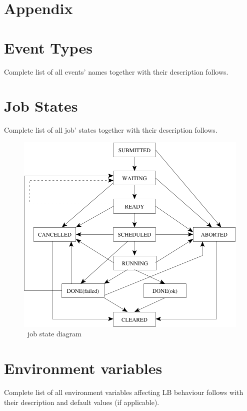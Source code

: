 \section*{Appendix}

\section{\LB Event Types}
\label{a:events}
Complete list of all events' names together with their description follows.


\newpage
\section{\LB Job States}
\label{a:jobstat}
Complete list of all job' states together with their description follows.


\begin{figure}[hb]
\centering
\includegraphics[width=.6\hsize]{images/wms2-jobstat}
\caption{\LB\ job state diagram}
\end{figure}

\newpage
\section{Environment variables}
\label{a:environment}

Complete list of all environment variables affecting LB behaviour follows with 
their description and default values (if applicable).


